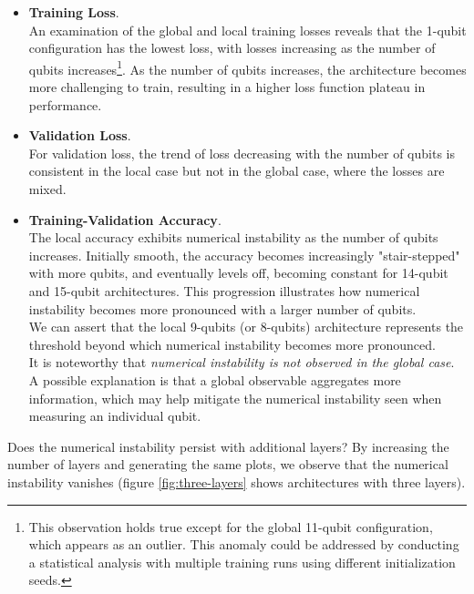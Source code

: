 \begin{itemize}
    \item \textbf{Training Loss}.\\ 
    An examination of the global and local training losses reveals that the 1-qubit configuration 
    has the lowest loss, with losses increasing as the number of qubits 
    increases\footnote[1]{This observation holds true except for the global 11-qubit configuration, 
    which appears as an outlier. This anomaly could be addressed by conducting a statistical analysis 
    with multiple training runs using different initialization seeds.}.
    As the number of qubits increases, the architecture becomes more challenging to train, resulting 
    in a higher loss function plateau in performance.
    \item \textbf{Validation Loss}.\\ 
    For validation loss, the trend of loss decreasing with the number of qubits is consistent 
    in the local case but not in the global case, where the losses are mixed.
    \item \textbf{Training-Validation Accuracy}.\\
    The local accuracy exhibits numerical instability as the number of qubits increases. 
    Initially smooth, the accuracy becomes increasingly "stair-stepped" with more qubits, 
    and eventually levels off, becoming constant for 14-qubit and 15-qubit architectures. 
    This progression illustrates how numerical instability becomes more pronounced with a 
    larger number of qubits.\\
    We can assert that the local 9-qubits (or 8-qubits) architecture represents the threshold beyond which numerical 
    instability becomes more pronounced.\\
    It is noteworthy that \textit{numerical instability is not observed in the global case}. 
    A possible explanation is that a global observable aggregates more information, which may 
    help mitigate the numerical instability seen when measuring an individual qubit.
\end{itemize}

Does the numerical instability persist with additional layers? 
By increasing the number of layers and generating the same plots, we observe that the numerical 
instability vanishes (figure \ref{fig:three-layers} shows architectures with three layers).

